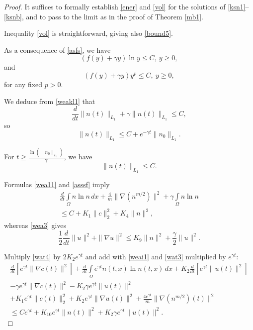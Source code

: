 \documentclass[10pt]{amsart}
\begin{document}
\begin{proof} It suffices to formally establish \eqref{ener} and \eqref{vol} for the solutions of \eqref{ksn1}--\eqref{ksnb}, and to pass to the limit as in the proof of Theorem \ref{mb1}.  

Inequality \eqref{vol} is straightforward, giving also \eqref{bound5}.

 As a consequence of \eqref{asfs}, we have \begin{equation} \label{asssf}(f(y)+\gamma y)\ln y \leq C,\ y\geq 0 , \end{equation} and
 \begin{equation} \label{asssf1}(f(y)+\gamma y)y^p \leq C,\ y\geq 0,\end{equation} for any fixed $p>0$.

 We deduce from \eqref{weakl1} that \begin{equation}\label{wat1} \frac d {dt} \|n(t)\|_{L_{1}} +\gamma \|n(t)\|_{L_{1}} \leq C,\end{equation} so \begin{equation}\label{wat2}\|n(t)\|_{L_{1}} \leq C+e^{-\gamma t}\|n_0\|_{L_1}. \end{equation}
 
For $t\geq \frac{\ln (\|n_0\|_{L_1})}\gamma$, we have 
 \begin{equation}\label{watc}\|n(t)\|_{L_{1}} \leq C. \end{equation}

Formulas \eqref{wea11} and \eqref{asssf} imply
\begin{multline}\label{wat3}
\frac {d}{dt} \int\limits_{\Omega} n\ln n \, dx + \frac 4 m \|\nabla(n^{m/2})\|^2 +\gamma \int\limits_{\Omega} n\ln n \\ \leq C+ K_1 \|c\|^2_2+ K_{4} \|n\|^2,
\end{multline}
whereas \eqref{wea3} gives
\begin{equation}\label{wat4}
\frac 1 2  \frac {d}{dt} \|u\|^2 + \|\nabla u\|^2 \leq K_9\|n\|^2+\frac \gamma 2 \|u\|^2.
\end{equation}

Multiply \eqref{wat4} by $2K_2 e^{\gamma t}$ and add with \eqref{weai1} and \eqref{wat3} multiplied by $e^{\gamma t}$:
\begin{multline}\label{wat5}
\frac {d}{dt} [e^{\gamma t} \|\nabla c(t)\|^2] + \frac {d}{dt} \int\limits_{\Omega} e^{\gamma t} n(t,x)\ln n(t,x) \, dx+  K_2\frac {d}{dt} [e^{\gamma t} \|u(t)\|^2] \\ -\gamma e^{\gamma t} \|\nabla c(t)\|^2-K_2 \gamma e^{\gamma t} \|u(t)\|^2 \\ +K_1 e^{\gamma t}  \|c(t)\|^2_2 + K_2 e^{\gamma t}  \|\nabla u(t)\|^2+  \frac {4 e^{\gamma t}} m \|\nabla(n^{m/2})(t)\|^2 \\ \leq C e^{\gamma t} +K_{10} e^{\gamma t}  \|n(t)\|^2+K_2 \gamma e^{\gamma t} \|u(t)\|^2.
\end{multline}


\end{proof}
\end{document}
